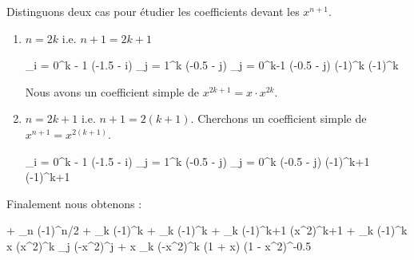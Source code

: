 \documentclass[12pt]{article}
\begin{document}
\bigskip


Distinguons deux cas pour étudier les coefficients devant les $x^{n+1}$.

\begin{enumerate}
	\item $n = 2 k$ i.e. $n + 1 = 2k + 1$
	
	\begin{explain}[style = ar]
		\displaystyle
		 \cdot {}
			\explnext{}
		\displaystyle
		 \cdot {}
			\explnext{}
		\displaystyle
		 \cdot \dprod_{i = 0}^{k - 1} (-1.5 - i) \cdot {}
		\displaystyle
		 \cdot \dprod_{j = 1}^{k} (-0.5 - j) \cdot {}
		\displaystyle
		 \cdot \dprod_{j = 0}^{k-1} (-0.5 - j) \cdot (-1)^{k}
			\explnext{}
		\displaystyle
		 \cdot (-1)^{k}
	\end{explain}
	
	Nous avons un coefficient simple de $x^{2k+1} = x \cdot x^{2k}$.
	
	\newpage
	
	
	\item $n = 2 k + 1$ i.e. $n + 1 = 2(k + 1)$. Cherchons un coefficient simple de $x^{n+1} = x^{2(k + 1)}$.
	
	\begin{explain}[style = ar]
		\displaystyle
		 \cdot {}
			\explnext{}
		\displaystyle
		 \cdot {}
			\explnext{}
		\displaystyle
		 \cdot \dprod_{i = 0}^{k - 1} (-1.5 - i) \cdot {}
		\displaystyle
		 \cdot \dprod_{j = 1}^{k} (-0.5 - j) \cdot {}
			\explnext{}
		\displaystyle
		 \cdot \dprod_{j = 0}^{k} (-0.5 - j) \cdot (-1)^{k+1}
			\explnext{}
		\displaystyle
		 \cdot (-1)^{k+1}
	\end{explain}
\end{enumerate}


\bigskip


Finalement nous obtenons :


\bigskip

\begin{explain}[style = ar]
	\displaystyle
	\int {} 
		\explnext{}
	 + \sum_{n }  \cdot (-1)^{n/2} 
		\explnext{}
	+ \sum_{k }  \cdot (-1)^{k} 
	+ \sum_{k }  \cdot (-1)^{k} 
		\explnext{}
	+ \sum_{k }  \cdot (-1)^{k+1} (x^2)^{k+1}
	+ \sum_{k }  \cdot (-1)^{k} \cdot x \cdot (x^2)^{k}
		\explnext{}
	\displaystyle
	\sum_{j }  \cdot (-x^2)^j
	+ x \cdot \sum_{k }  \cdot (-x^2)^{k}
		\explnext{}
	\displaystyle
	(1 + x) (1 - x^2)^{-0.5}
		\explnext{}
\end{explain}
\end{document}
